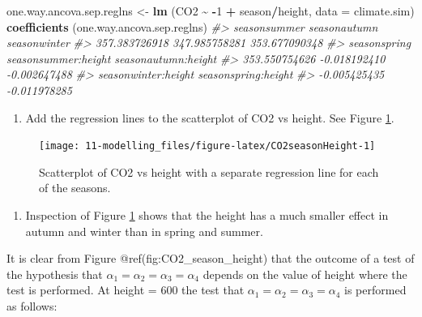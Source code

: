 \documentclass[
]{book}
\newenvironment{Shaded}{\begin{snugshade}}{\end{snugshade}}
\newcommand{\AttributeTok}[1]{\textcolor[rgb]{0.13,0.29,0.53}{#1}}
\newcommand{\CommentTok}[1]{\textcolor[rgb]{0.56,0.35,0.01}{\textit{#1}}}
\newcommand{\DecValTok}[1]{\textcolor[rgb]{0.00,0.00,0.81}{#1}}
\newcommand{\FunctionTok}[1]{\textcolor[rgb]{0.13,0.29,0.53}{\textbf{#1}}}
\newcommand{\NormalTok}[1]{#1}
\newcommand{\OtherTok}[1]{\textcolor[rgb]{0.56,0.35,0.01}{#1}}
\newcommand{\SpecialCharTok}[1]{\textcolor[rgb]{0.81,0.36,0.00}{\textbf{#1}}}
\providecommand{\tightlist}{%
  \setlength{\itemsep}{0pt}\setlength{\parskip}{0pt}}
\begin{document}
\begin{Shaded}
\begin{Highlighting}[]
\NormalTok{one.way.ancova.sep.reglns }\OtherTok{\textless{}{-}} \FunctionTok{lm}\NormalTok{ (CO2 }\SpecialCharTok{\textasciitilde{}} \SpecialCharTok{{-}}\DecValTok{1} \SpecialCharTok{+}\NormalTok{ season}\SpecialCharTok{/}\NormalTok{height, }\AttributeTok{data =}\NormalTok{ climate.sim)}
\FunctionTok{coefficients}\NormalTok{ (one.way.ancova.sep.reglns)}
\CommentTok{\#\textgreater{}        seasonsummer        seasonautumn        seasonwinter }
\CommentTok{\#\textgreater{}       357.383726918       347.985758281       353.677090348 }
\CommentTok{\#\textgreater{}        seasonspring seasonsummer:height seasonautumn:height }
\CommentTok{\#\textgreater{}       353.550754626        {-}0.018192410        {-}0.002647488 }
\CommentTok{\#\textgreater{} seasonwinter:height seasonspring:height }
\CommentTok{\#\textgreater{}        {-}0.005425435        {-}0.011978285}
\end{Highlighting}
\end{Shaded}

\begin{enumerate}
\def\labelenumi{(\roman{enumi})}
\setcounter{enumi}{1}
\tightlist
\item
  Add the regression lines to the scatterplot of CO2 vs height. See Figure \ref{fig:CO2seasonHeight}.
\end{enumerate}

\begin{figure}
\texttt{[image: 11-modelling\_files/figure-latex/CO2seasonHeight-1]} \caption{Scatterplot of CO2 vs height with a separate regression line for each of the seasons.}\label{fig:CO2seasonHeight}
\end{figure}

\begin{enumerate}
\def\labelenumi{(\roman{enumi})}
\setcounter{enumi}{2}
\tightlist
\item
  Inspection of Figure \ref{fig:CO2seasonHeight} shows that the height has a much smaller effect in autumn and winter than in spring and summer.
\end{enumerate}

It is clear from Figure @ref(fig:CO2\_season\_height) that the outcome of a test of the hypothesis that \(\alpha_1 = \alpha_2 = \alpha_3 = \alpha_4\) depends on the value of height where the test is performed. At height = 600 the test that \(\alpha_1 = \alpha_2 = \alpha_3 = \alpha_4\) is performed as follows:
\end{document}
